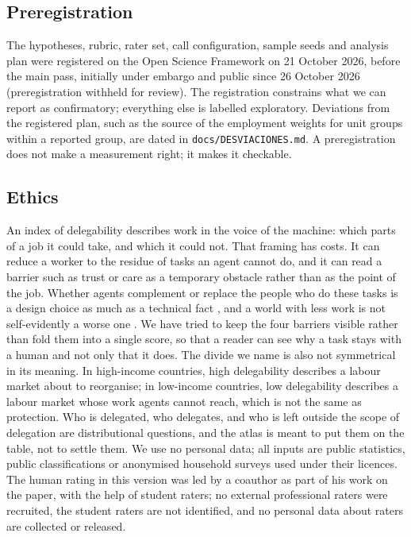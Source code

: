 \documentclass[preprint,12pt,authoryear]{elsarticle}
\newcommand{\prerregcita}{(preregistration withheld for review)}
\newcommand{\prerregcita}{\citep{espinal2026prereg}}
\begin{document}
\subsection{Preregistration}

The hypotheses, rubric, rater set, call configuration, sample seeds and analysis plan were registered on the Open Science Framework on 21 October 2026, before the main pass, initially under embargo and public since 26 October 2026 \prerregcita.
The registration constrains what we can report as confirmatory; everything else is labelled exploratory.
Deviations from the registered plan, such as the source of the employment weights for unit groups within a reported group, are dated in \texttt{docs/DESVIACIONES.md}.
A preregistration does not make a measurement right; it makes it checkable.

\subsection{Ethics}

An index of delegability describes work in the voice of the machine: which parts of a job it could take, and which it could not.
That framing has costs.
It can reduce a worker to the residue of tasks an agent cannot do, and it can read a barrier such as trust or care as a temporary obstacle rather than as the point of the job.
Whether agents complement or replace the people who do these tasks is a design choice as much as a technical fact \citep{autor2024applying}, and a world with less work is not self-evidently a worse one \citep{danaher2019automation}.
We have tried to keep the four barriers visible rather than fold them into a single score, so that a reader can see why a task stays with a human and not only that it does.
The divide we name is also not symmetrical in its meaning.
In high-income countries, high delegability describes a labour market about to reorganise; in low-income countries, low delegability describes a labour market whose work agents cannot reach, which is not the same as protection.
Who is delegated, who delegates, and who is left outside the scope of delegation are distributional questions, and the atlas is meant to put them on the table, not to settle them.
We use no personal data; all inputs are public statistics, public classifications or anonymised household surveys used under their licences.
The human rating in this version was led by a coauthor as part of his work on the paper, with the help of student raters; no external professional raters were recruited, the student raters are not identified, and no personal data about raters are collected or released.
\end{document}

